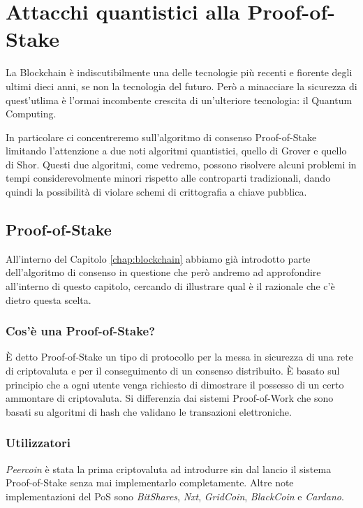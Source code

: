 \chapter{Attacchi quantistici alla Proof-of-Stake}
La Blockchain è indiscutibilmente una delle tecnologie più recenti e fiorente degli ultimi dieci anni, se non la tecnologia del futuro. Però a minacciare la sicurezza di quest'utlima è l'ormai incombente crescita di un'ulteriore tecnologia: il Quantum Computing.

In particolare ci concentreremo sull'algoritmo di consenso Proof-of-Stake limitando l'attenzione a due noti algoritmi quantistici, quello di Grover e quello di Shor. Questi due algoritmi, come vedremo, possono risolvere alcuni problemi in tempi considerevolmente minori rispetto alle controparti tradizionali, dando quindi la possibilità di violare schemi di crittografia a chiave pubblica.

\section{Proof-of-Stake}
All'interno del Capitolo \ref{chap:blockchain} abbiamo già introdotto parte dell'algoritmo di consenso in questione che però andremo ad approfondire all'interno di questo capitolo, cercando di illustrare qual è il razionale che c'è dietro questa scelta.

\subsection{Cos'è una Proof-of-Stake?}
È detto Proof-of-Stake un tipo di protocollo per la messa in sicurezza di una rete di criptovaluta e per il conseguimento di un consenso distribuito. È basato sul principio che a ogni utente venga richiesto di dimostrare il possesso di un certo ammontare di criptovaluta. Si differenzia dai sistemi Proof-of-Work che sono basati su algoritmi di hash che validano le transazioni elettroniche.

\subsection{Utilizzatori}
\textit{Peercoin} è stata la prima criptovaluta ad introdurre sin dal lancio il sistema Proof-of-Stake senza mai implementarlo completamente. Altre note implementazioni del PoS sono \textit{BitShares}, \textit{Nxt}, \textit{GridCoin}, \textit{BlackCoin} e \textit{Cardano}.

